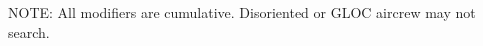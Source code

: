 \begin{onecolumntablefloat}
\begin{onecolumntable}
\begin{tablenote}{\linewidth}
NOTE: All modifiers are cumulative. Disoriented or GLOC aircrew may not search.
\end{tablenote}
\end{onecolumntable}
\end{onecolumntablefloat}

